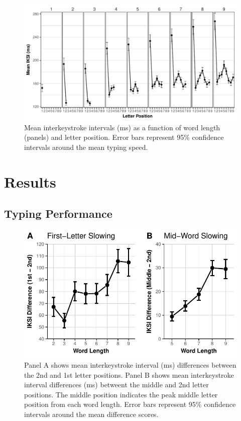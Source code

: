 \documentclass[,man,floatsintext]{apa6}
\begin{document}
\begin{figure}
\centering
\includegraphics{v2-manuscript_files/figure-latex/figure1-1.pdf}
\caption{\label{fig:figure1}Mean interkeystroke intervals (ms) as a function of word length (panels) and letter position. Error bars represent 95\% confidence intervals around the mean typing speed.}
\end{figure}



\hypertarget{results}{%
\section{Results}\label{results}}

\hypertarget{typing-performance}{%
\subsection{Typing Performance}\label{typing-performance}}



\begin{figure}
\centering
\includegraphics{v2-manuscript_files/figure-latex/figure2-1.pdf}
\caption{\label{fig:figure2}Panel A shows mean interkeystroke interval (ms) differences between the 2nd and 1st letter positions. Panel B shows mean interkeystroke interval differences (ms) betweent the middle and 2nd letter positions. The middle position indicates the peak middle letter position from each word length. Error bars represent 95\% confidence intervals around the mean difference scores.}
\end{figure}
\end{document}
